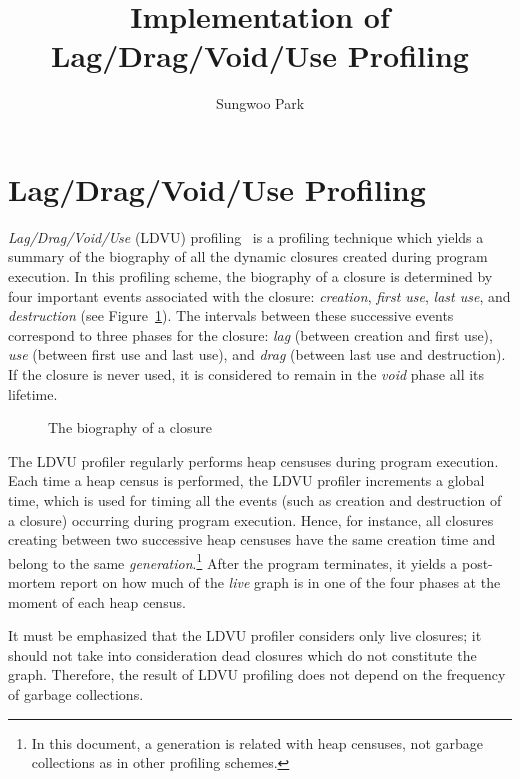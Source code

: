 \documentclass{article}
\begin{document}
\title{Implementation of Lag/Drag/Void/Use Profiling}
\author{Sungwoo Park}

\makeatactive
\maketitle

\section{Lag/Drag/Void/Use Profiling}

\emph{Lag/Drag/Void/Use} (LDVU) profiling~\cite{RR} is a profiling technique 
which yields a summary of the biography of all the dynamic closures created
during program execution.
In this profiling scheme,
the biography of a closure is determined by four important events associated
with the closure: \emph{creation}, \emph{first use}, 
\emph{last use}, and \emph{destruction} (see Figure~\ref{fig-ldv}).
The intervals between these successive events correspond to three phases
for the closure: \emph{lag} (between creation and first use), 
\emph{use} (between first use and last use), and 
\emph{drag} (between last use and destruction).
If the closure is never used, it is considered to remain in the \emph{void}
phase all its lifetime.

\begin{figure}[ht]
\begin{center}

\caption{The biography of a closure}
\label{fig-ldv}
\end{center}
\end{figure}

The LDVU profiler regularly performs heap censuses during program execution.
Each time a heap census is performed, the LDVU profiler increments a global
time, which is used for timing all the events (such as creation and destruction
of a closure) occurring during program execution.
Hence, for instance, all closures creating between two successive heap censuses
have the same creation time and belong to the same \emph{generation}.\footnote{In
this document, a generation is related with heap censuses, not garbage collections
as in other profiling schemes.}
After the program terminates, it yields a post-mortem report on how much 
of the \emph{live} graph is in one of the four phases at the moment of each 
heap census.

It must be emphasized that the LDVU profiler considers only live closures;
it should not take into consideration dead closures which do not constitute
the graph. Therefore, the result of LDVU profiling does not depend on the
frequency of garbage collections.
\end{document}
